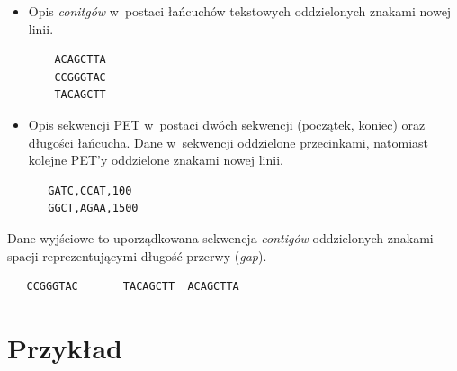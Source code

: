 \documentclass[a4paper,10pt]{article}
\begin{document}
\begin{itemize}
 \item Opis \emph{conitgów} w~postaci łańcuchów tekstowych oddzielonych znakami nowej linii.
 
  \begin{verbatim}
    ACAGCTTA
    CCGGGTAC
    TACAGCTT
  \end{verbatim}
  \item Opis sekwencji PET w~postaci dwóch sekwencji (początek, koniec) oraz długości łańcucha. Dane w~sekwencji oddzielone przecinkami, natomiast kolejne PET'y oddzielone znakami nowej linii.
  
  \begin{verbatim}
   GATC,CCAT,100
   GGCT,AGAA,1500
  \end{verbatim}
\end{itemize}

Dane wyjściowe to uporządkowana sekwencja \emph{contigów} oddzielonych znakami spacji reprezentującymi długość przerwy (\emph{gap}).

  \begin{verbatim}
   CCGGGTAC       TACAGCTT  ACAGCTTA
  \end{verbatim}

\section*{Przykład}
\end{document}
